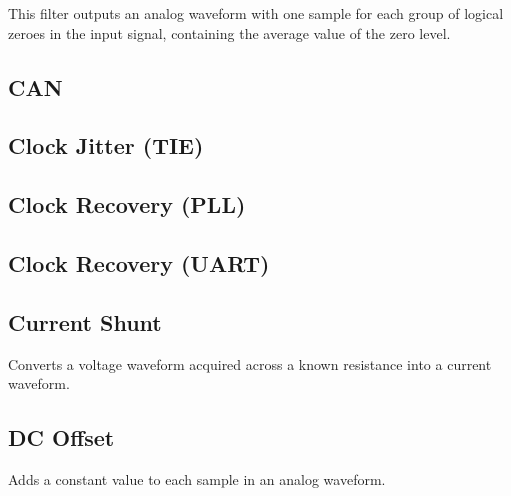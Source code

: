 This filter outputs an analog waveform with one sample for each group of logical zeroes in the input signal, containing
the average value of the zero level.

\pagebreak
\subsection{CAN}

\pagebreak
\subsection{Clock Jitter (TIE)}

\pagebreak
\subsection{Clock Recovery (PLL)}
\label{filter:cdrpll}

\pagebreak
\subsection{Clock Recovery (UART)}

\pagebreak
\subsection{Current Shunt}

Converts a voltage waveform acquired across a known resistance into a current waveform.

\pagebreak
\subsection{DC Offset}

Adds a constant value to each sample in an analog waveform.

